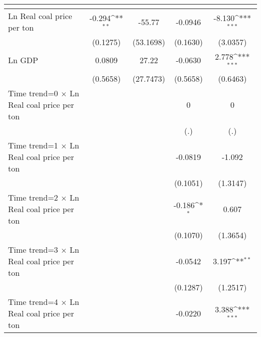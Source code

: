 {
\def\sym#1{\ifmmode^{#1}\else\(^{#1}\)\fi}
\begin{tabular}{l*{4}{c}}
\toprule
                    &&&&\\
\midrule
Ln Real coal price per ton&      -0.294\sym{**} &      -55.77         &     -0.0946         &      -8.130\sym{***}\\
                    &    (0.1275)         &   (53.1698)         &    (0.1630)         &    (3.0357)         \\
\addlinespace
Ln GDP              &      0.0809         &       27.22         &     -0.0630         &       2.778\sym{***}\\
                    &    (0.5658)         &   (27.7473)         &    (0.5658)         &    (0.6463)         \\
\addlinespace
Time trend=0 $\times$ Ln Real coal price per ton&                     &                     &           0         &           0         \\
                    &                     &                     &         (.)         &         (.)         \\
\addlinespace
Time trend=1 $\times$ Ln Real coal price per ton&                     &                     &     -0.0819         &      -1.092         \\
                    &                     &                     &    (0.1051)         &    (1.3147)         \\
\addlinespace
Time trend=2 $\times$ Ln Real coal price per ton&                     &                     &      -0.186\sym{*}  &       0.607         \\
                    &                     &                     &    (0.1070)         &    (1.3654)         \\
\addlinespace
Time trend=3 $\times$ Ln Real coal price per ton&                     &                     &     -0.0542         &       3.197\sym{**} \\
                    &                     &                     &    (0.1287)         &    (1.2517)         \\
\addlinespace
Time trend=4 $\times$ Ln Real coal price per ton&                     &                     &     -0.0220         &       3.388\sym{***}\\

\end{tabular}}
